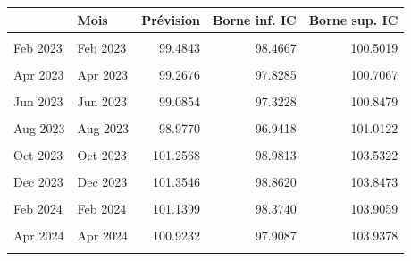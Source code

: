 \centering
\centering
\begin{tabular}[t]{llrrr}
\toprule
  & Mois & Prévision & Borne inf. IC & Borne sup. IC\\
\midrule
\cellcolor{gray!10}{Jan 2023} & \cellcolor{gray!10}{Jan 2023} & \cellcolor{gray!10}{99.3879} & \cellcolor{gray!10}{98.6683} & \cellcolor{gray!10}{100.1075}\\
Feb 2023 & Feb 2023 & 99.4843 & 98.4667 & 100.5019\\
\cellcolor{gray!10}{Mar 2023} & \cellcolor{gray!10}{Mar 2023} & \cellcolor{gray!10}{99.3761} & \cellcolor{gray!10}{98.1298} & \cellcolor{gray!10}{100.6224}\\
Apr 2023 & Apr 2023 & 99.2676 & 97.8285 & 100.7067\\
\cellcolor{gray!10}{May 2023} & \cellcolor{gray!10}{May 2023} & \cellcolor{gray!10}{99.1352} & \cellcolor{gray!10}{97.5262} & \cellcolor{gray!10}{100.7442}\\
Jun 2023 & Jun 2023 & 99.0854 & 97.3228 & 100.8479\\
\cellcolor{gray!10}{Jul 2023} & \cellcolor{gray!10}{Jul 2023} & \cellcolor{gray!10}{99.0626} & \cellcolor{gray!10}{97.1588} & \cellcolor{gray!10}{100.9664}\\
Aug 2023 & Aug 2023 & 98.9770 & 96.9418 & 101.0122\\
\cellcolor{gray!10}{Sep 2023} & \cellcolor{gray!10}{Sep 2023} & \cellcolor{gray!10}{99.8239} & \cellcolor{gray!10}{97.6652} & \cellcolor{gray!10}{101.9826}\\
Oct 2023 & Oct 2023 & 101.2568 & 98.9813 & 103.5322\\
\cellcolor{gray!10}{Nov 2023} & \cellcolor{gray!10}{Nov 2023} & \cellcolor{gray!10}{101.4134} & \cellcolor{gray!10}{99.0268} & \cellcolor{gray!10}{103.7999}\\
Dec 2023 & Dec 2023 & 101.3546 & 98.8620 & 103.8473\\
\cellcolor{gray!10}{Jan 2024} & \cellcolor{gray!10}{Jan 2024} & \cellcolor{gray!10}{101.0475} & \cellcolor{gray!10}{98.4146} & \cellcolor{gray!10}{103.6803}\\
Feb 2024 & Feb 2024 & 101.1399 & 98.3740 & 103.9059\\
\cellcolor{gray!10}{Mar 2024} & \cellcolor{gray!10}{Mar 2024} & \cellcolor{gray!10}{101.0317} & \cellcolor{gray!10}{98.1388} & \cellcolor{gray!10}{103.9246}\\
Apr 2024 & Apr 2024 & 100.9232 & 97.9087 & 103.9378\\
\cellcolor{gray!10}{May 2024} & \cellcolor{gray!10}{May 2024} & \cellcolor{gray!10}{100.7908} & \cellcolor{gray!10}{97.6594} & \cellcolor{gray!10}{103.9223}\\

\end{tabular}

